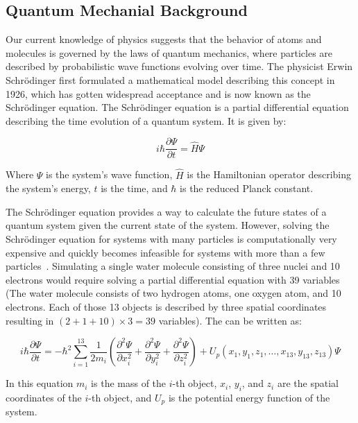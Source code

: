 \subsection{Quantum Mechanial Background}

Our current knowledge of physics suggests that the behavior of atoms and molecules is governed by the laws of quantum mechanics, where particles are described by probabilistic wave functions evolving over time. The physicist Erwin Schrödinger first formulated a mathematical model describing this concept in 1926, which has gotten widespread acceptance and is now known as the Schrödinger equation. The Schrödinger equation is a partial differential equation describing the time evolution of a quantum system. It is given by:

\begin{equation}
      i \hbar \frac{\partial \Psi}{\partial t} = \hat{H} \Psi
\end{equation}

Where $\Psi$ is the system's wave function, $\hat{H}$ is the Hamiltonian operator describing the system's energy, $t$ is the time, and $\hbar$ is the reduced Planck constant.
\smallskip

The Schrödinger equation provides a way to calculate the future states of a quantum system given the current state of the system. However, solving the Schrödinger equation for systems with many particles is computationally very expensive and quickly becomes infeasible for systems with more than a few particles~\cite{Leimkuhler2015}. Simulating a single water molecule consisting of three nuclei and 10 electrons would require solving a partial differential equation with 39 variables (The water molecule consists of two hydrogen atoms, one oxygen atom, and 10 electrons. Each of those 13 objects is described by three spatial coordinates resulting in $(2+1+10)\times 3 = 39$ variables). The can be written as:

\begin{equation}
      i \hbar \frac{\partial \Psi}{\partial t} = -\hbar^2 \sum_{i=1}^{13} \frac{1}{2m_i} \left( \frac{\partial^2 \Psi}{\partial x_i^2} + \frac{\partial^2 \Psi}{\partial y_i^2} + \frac{\partial^2 \Psi}{\partial z_i^2} \right) + U_p (x_1, y_1, z_1, \ldots, x_{13}, y_{13}, z_{13}) \Psi
\end{equation}

In this equation $m_i$ is the mass of the $i$-th object, $x_i$, $y_i$, and $z_i$ are the spatial coordinates of the $i$-th object, and $U_p$ is the potential energy function of the system.
\smallskip

